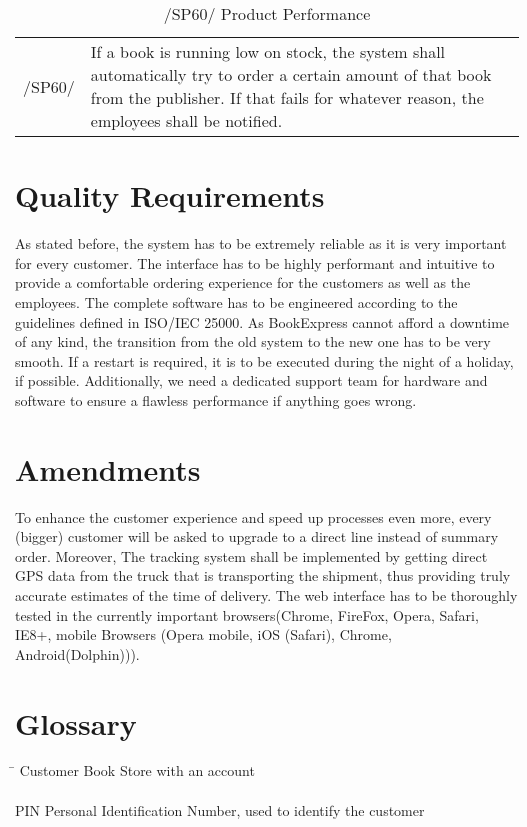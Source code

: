 \documentclass[11pt,a4paper,oneside,svgnames]{report}
\begin{document}
\begin{table}[H]
\centering
\begin{tabular}{p{1.5cm}p{11cm}}
\cellcolor{white}/SP60/ & If a book is running low on stock, the system shall automatically try to order a certain amount of that book from the publisher.  If that fails for whatever reason, the employees shall be notified. \\
\end{tabular}
\caption{/SP60/ Product Performance}
\end{table}

\chapter{Quality Requirements}
As stated before, the system has to be extremely reliable as it is very important for every customer. The interface has to be highly performant and intuitive to provide a comfortable ordering experience for the customers as well as the employees. The complete software has to be engineered according to the guidelines defined in ISO/IEC 25000. As BookExpress cannot afford a downtime of any kind, the transition from the old system to the new one has to be very smooth. If a restart is required, it is to be executed during the night of a holiday, if possible. Additionally, we need a dedicated support team for hardware and software to ensure a flawless performance if anything goes wrong.
\chapter{Amendments}
To enhance the customer experience and speed up processes even more, every (bigger) customer will be asked to upgrade to a direct line instead of summary order. Moreover, The tracking system shall be implemented by getting direct GPS data from the truck that is transporting the shipment, thus providing truly accurate estimates of the time of delivery. The web interface has to be thoroughly tested in the currently important browsers(Chrome, FireFox, Opera, Safari, IE8+, mobile Browsers (Opera mobile, iOS (Safari), Chrome, Android(Dolphin))).
\chapter{Glossary}
\begin{tabbing}
\hspace{3cm}\=\kill
	Customer  \> Book Store with an account\\
	\\
	PIN       \> Personal Identification Number, used to identify the customer\\
	\\
	 
\end{tabbing} 

\listoftables{}
\end{document}
